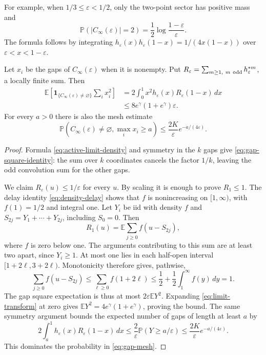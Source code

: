 \documentclass[11pt,letterpaper]{article}
\newcommand{\PP}{\mathbb P}\newcommand{\EE}{\mathbb E}
\newcommand{\ind}{\mathbf 1}\newcommand{\Exp}{\operatorname{Exp}}
\begin{document}
For example, when $1/3\le\varepsilon<1/2$, only the two-point sector
has positive mass and
\[
 \PP(|C_\infty(\varepsilon)|=2)
       =\frac12\log\frac{1-\varepsilon}{\varepsilon}.
\]
The formula follows by integrating
$h_\varepsilon(x)h_\varepsilon(1-x)=1/(4x(1-x))$ over
$\varepsilon<x<1-\varepsilon$.

\begin{lemma}\label{lem:gap-squares}
Let $x_i$ be the gaps of $C_\infty(\varepsilon)$ when it is nonempty.
Put $R_\varepsilon=\sum_{m\ge1,\ m\ {\rm odd}}
h_\varepsilon^{*m}$, a locally finite sum. Then
\begin{align}
 \EE\left[\ind_{\{C_\infty(\varepsilon)\ne\varnothing\}}
                         \sum_i x_i^2\right]
 &=2\int_0^1 x^2 h_\varepsilon(x)R_\varepsilon(1-x)\,dx
      \label{eq:gap-square-identity}\\
 &\le 8e^\gamma(1+e^\gamma)\varepsilon.\nonumber
\end{align}
For every $a>0$ there is also the mesh estimate
\begin{equation}\label{eq:gap-mesh}
 \PP\left(C_\infty(\varepsilon)\ne\varnothing,
                     \max_i x_i\ge a\right)
 \le\frac{2K}{\varepsilon}e^{-a/(4\varepsilon)}.
\end{equation}
\end{lemma}
\begin{proof}
Formula \eqref{eq:active-limit-density} and symmetry in the $k$ gaps
give \eqref{eq:gap-square-identity}: the sum over $k$ coordinates cancels
the factor $1/k$, leaving the odd convolution sum for the other gaps.

We claim $R_\varepsilon(u)\le1/\varepsilon$ for every $u$. By scaling
it is enough to prove $R_1\le1$. The delay identity
\eqref{eq:density-delay} shows that $f$ is nonincreasing on $[1,\infty)$,
with $f(1)=1/2$ and integral one. Let $Y_i$ be iid with density $f$ and
$S_{2j}=Y_1+\cdots+Y_{2j}$, including $S_0=0$. Then
\[
 R_1(u)=\EE\sum_{j\ge0}f(u-S_{2j}),
\]
where $f$ is zero below one. The arguments contributing to this sum
are at least two apart, since $Y_i\ge1$. At most one lies in each
half-open interval $[1+2\ell,3+2\ell)$. Monotonicity therefore gives,
pathwise,
\[
 \sum_{j\ge0}f(u-S_{2j})
 \le\sum_{\ell\ge0}f(1+2\ell)
 \le\frac12+\frac12\int_1^\infty f(y)\,dy=1.
\]
The gap square expectation is thus at most
$2\varepsilon\EE Y^2$. Expanding \eqref{eq:limit-transform} at zero
gives $\EE Y^2=4e^\gamma(1+e^\gamma)$, proving the bound. The same
symmetry argument bounds the expected number of gaps of length at least
$a$ by
\[
 2\int_a^1 h_\varepsilon(x)R_\varepsilon(1-x)\,dx
 \le\frac2\varepsilon\PP(Y\ge a/\varepsilon)
 \le\frac{2K}{\varepsilon}e^{-a/(4\varepsilon)}.
\]
This dominates the probability in \eqref{eq:gap-mesh}.
\end{proof}
\end{document}
